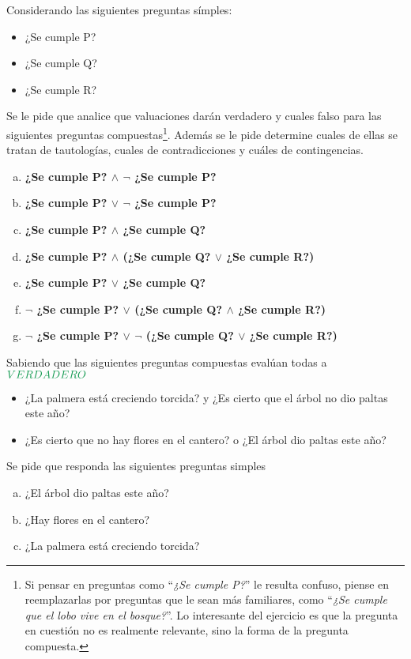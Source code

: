 \begin{exercise}
    Considerando las siguientes preguntas símples:
    \begin{itemize}
        \item ¿Se cumple P?
        \item ¿Se cumple Q?
        \item ¿Se cumple R?
    \end{itemize}

    Se le pide que analice que valuaciones darán verdadero y cuales falso para
        las siguientes preguntas compuestas\footnote{ Si pensar en preguntas
        como ``\textit{¿Se cumple P?}'' le resulta confuso, piense en
        reemplazarlas por preguntas que le sean más familiares, como
        ``\textit{¿Se cumple que el lobo vive en el bosque?}''. Lo interesante
        del ejercicio es que la pregunta en cuestión no es realmente relevante,
        sino la forma de la pregunta compuesta. }. Además se le pide determine
        cuales de ellas se tratan de tautologías, cuales de contradicciones y
        cuáles de contingencias.
    \begin{enumerate}[a)]
        \item \textbf{¿Se cumple P? $\land$ $\lnot$ ¿Se cumple P?}
        \item \textbf{¿Se cumple P? $\lor$ $\lnot$ ¿Se cumple P?}
        \item \textbf{¿Se cumple P? $\land$ ¿Se cumple Q?}
        \item \textbf{¿Se cumple P? $\land$ (¿Se cumple Q? $\lor$ ¿Se cumple
        R?)}
        \item \textbf{¿Se cumple P? $\lor$ ¿Se cumple Q?}
        \item \textbf{$\lnot$ ¿Se cumple P? $\lor$ (¿Se cumple Q? $\land$ ¿Se
        cumple R?)}
        \item \textbf{$\lnot$ ¿Se cumple P? $\lor$ $\lnot$ (¿Se cumple Q? $\lor$
        ¿Se cumple R?)}
    \end{enumerate}
\end{exercise}

\begin{exercise}
    Sabiendo que las siguientes preguntas compuestas evalúan todas a
    $\ltruefull$
    \begin{itemize}
    \item ¿La palmera está creciendo torcida? y ¿Es cierto que el árbol no dio
    paltas este año?
    \item ¿Es cierto que no hay flores en el cantero? o ¿El árbol dio paltas
    este año?
    \end{itemize}

    Se pide que responda las siguientes preguntas simples
    \begin{enumerate}[a)]
        \item ¿El árbol dio paltas este año?
        \item ¿Hay flores en el cantero?
        \item ¿La palmera está creciendo torcida?
    \end{enumerate}
\end{exercise}


